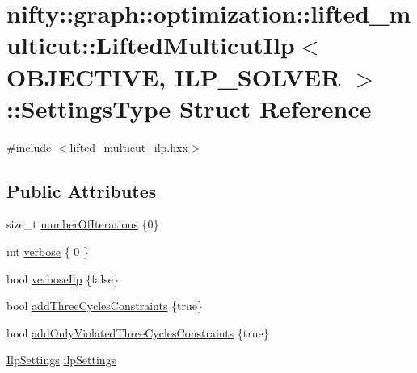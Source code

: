 \hypertarget{structnifty_1_1graph_1_1optimization_1_1lifted__multicut_1_1LiftedMulticutIlp_1_1SettingsType}{}\section{nifty\+:\+:graph\+:\+:optimization\+:\+:lifted\+\_\+multicut\+:\+:Lifted\+Multicut\+Ilp$<$ O\+B\+J\+E\+C\+T\+I\+V\+E, I\+L\+P\+\_\+\+S\+O\+L\+V\+E\+R $>$\+:\+:Settings\+Type Struct Reference}
\label{structnifty_1_1graph_1_1optimization_1_1lifted__multicut_1_1LiftedMulticutIlp_1_1SettingsType}


{\ttfamily \#include $<$lifted\+\_\+multicut\+\_\+ilp.\+hxx$>$}

\subsection*{Public Attributes}
\begin{DoxyCompactItemize}
\item 
size\+\_\+t \hyperlink{structnifty_1_1graph_1_1optimization_1_1lifted__multicut_1_1LiftedMulticutIlp_1_1SettingsType_a1d88859439cbbdb8898528cd97345c27}{number\+Of\+Iterations} \{0\}
\item 
int \hyperlink{structnifty_1_1graph_1_1optimization_1_1lifted__multicut_1_1LiftedMulticutIlp_1_1SettingsType_a582087f74af07aed4406832115226c04}{verbose} \{ 0 \}
\item 
bool \hyperlink{structnifty_1_1graph_1_1optimization_1_1lifted__multicut_1_1LiftedMulticutIlp_1_1SettingsType_a731e01272e2770a11440842b132bbef9}{verbose\+Ilp} \{false\}
\item 
bool \hyperlink{structnifty_1_1graph_1_1optimization_1_1lifted__multicut_1_1LiftedMulticutIlp_1_1SettingsType_a1f1fef13d1bed966e37c2ee15616505b}{add\+Three\+Cycles\+Constraints} \{true\}
\item 
bool \hyperlink{structnifty_1_1graph_1_1optimization_1_1lifted__multicut_1_1LiftedMulticutIlp_1_1SettingsType_a841c879cd6d0f1c5bcb787be651af50a}{add\+Only\+Violated\+Three\+Cycles\+Constraints} \{true\}
\item 
\hyperlink{classnifty_1_1graph_1_1optimization_1_1lifted__multicut_1_1LiftedMulticutIlp_a743d074db63df1f079c6a72610e49534}{Ilp\+Settings} \hyperlink{structnifty_1_1graph_1_1optimization_1_1lifted__multicut_1_1LiftedMulticutIlp_1_1SettingsType_a753082c01b5fb27b5e8433093eae1c32}{ilp\+Settings}
\end{DoxyCompactItemize}


